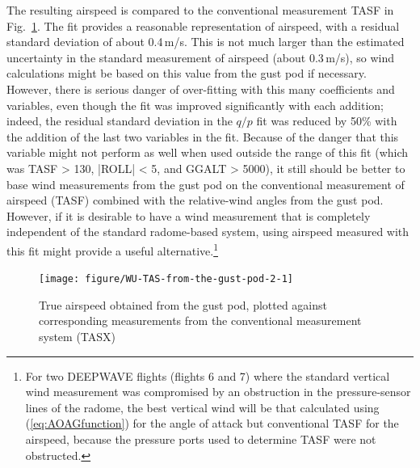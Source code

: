 \documentclass[12pt,twoside,english]{article}\usepackage[]{graphicx}\usepackage[]{color}
\newenvironment{knitrout}{}{} %
\let\OrgIndex\index
\renewcommand*{\index}[1]{\OrgIndex{#1}}
\begin{document}
The resulting airspeed is compared to the conventional measurement TASF in Fig.~\ref{fig:TAS-from-the-gust-pod-2}. The fit provides a reasonable representation of airspeed, with a residual standard deviation of about 0.4\,m/s. This is not much larger than the estimated uncertainty in the standard measurement of airspeed (about 0.3\,m/s), so wind calculations might be based on this value from the gust pod if necessary. However, there is serious danger of over-fitting with this many coefficients and variables, even though the fit was improved significantly with each addition; indeed, the residual standard deviation in the $q/p$ fit was reduced by 50\% with the addition of the last two variables in the fit. Because of the danger that this variable might not perform as well when  used outside the range of this fit (which was TASF > 130, |ROLL| < 5, and GGALT > 5000),  it still should be better to base wind measurements from the gust pod on the  conventional measurement of airspeed (TASF) combined with the relative-wind angles from the gust pod. However, if it is desirable to have a wind measurement that is completely independent of the standard radome-based system, using airspeed measured with this fit might provide a useful alternative.\footnote{For two DEEPWAVE flights (flights 6 and 7) where the standard vertical wind measurement was compromised by an obstruction in the pressure-sensor lines of the radome, the best vertical wind will be that calculated using (\ref{eq:AOAGfunction}) for the angle of attack but conventional TASF for the airspeed, because the pressure ports used to determine TASF were not obstructed.} 

\begin{knitrout}\footnotesize
{}\color{fgcolor}\begin{figure}

{\centering \texttt{[image: figure/WU-TAS-from-the-gust-pod-2-1]} 

}

\caption[True airspeed obtained from the gust pod, plotted against corresponding measurements from the conventional measurement system (TASX)]{True airspeed obtained from the gust pod, plotted against corresponding measurements from the conventional measurement system (TASX)}\label{fig:TAS-from-the-gust-pod-2}
\end{figure}


\end{knitrout}
\end{document}
